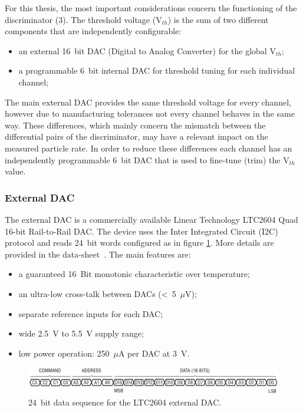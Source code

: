 \noindent For this thesis, the most important considerations concern the functioning of the discriminator (3).
The threshold voltage (V$_{th}$) is the sum of two different components that are independently configurable:
\begin{itemize}
	\item an external 16~bit DAC (Digital to Analog Converter) for the global V$_{th}$;
	\item a programmable 6~bit internal DAC for threshold tuning for each individual channel;
\end{itemize}
\noindent The main external DAC provides the same threshold voltage for every channel, however due to manufacturing tolerances not every channel behaves in the same way.
These differences, which mainly concern the mismatch between the differential pairs of the discriminator, may have a relevant impact on the measured particle rate.
In order to reduce these differences each channel has an independently programmable 6~bit DAC that is used to fine-tune (trim) the V$_{th}$ value.    
\subsubsection{External DAC}
The external DAC is a commercially available Linear Technology LTC2604 Quad 16-bit Rail-to-Rail DAC.
The device uses the Inter Integrated Circuit (I2C) protocol and reads 24~bit words configured as in figure \ref{fig:extdactiming2}.
More details are provided in the data-sheet~\cite{LTC2604}.
The main features are:
\begin{itemize}
	\item a guaranteed 16~Bit monotonic characteristic over temperature;
	\item an ultra-low cross-talk between DACs (<~5~$\mu$V);
	\item separate reference inputs for each DAC;
	\item wide 2.5~V to 5.5~V supply range;
	\item low power operation: 250~$\mu$A per DAC at 3~V.
\end{itemize} 
\begin{figure}[H]
	\centering
	\includegraphics[width=0.99\linewidth]{IMG/ch2/EXTDACTIMING2}
	\caption{24~bit data sequence for the LTC2604 external DAC.}
	\label{fig:extdactiming2}
\end{figure}
